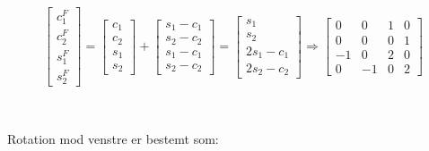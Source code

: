 \documentclass[a4paper,12pt]{article}
\begin{document}
\[
\left[\begin{array}{ccc}
    c^F_1\\
    c^F_2\\
    s^F_1\\
    s^F_2
\end{array}\right]
=
\left[\begin{array}{ccc}
    c_1\\
    c_2\\
    s_1\\
    s_2
\end{array}\right]
+
\left[\begin{array}{ccc}
    s_1-c_1\\
    s_2-c_2\\
    s_1-c_1\\
    s_2-c_2
\end{array}\right]
=
\left[\begin{array}{ccc}
    s_1\\
    s_2\\
    2s_1-c_1\\
    2s_2-c_2
\end{array}\right]
\Rightarrow
\left[\begin{array}{cccc}
    0 & 0 & 1 & 0\\
    0 & 0 & 0 & 1\\
    -1 & 0 & 2 & 0\\
    0 & -1 & 0 & 2
\end{array}\right]
\]\\


\subsection{}
Rotation mod venstre er bestemt som:\\
\end{document}
